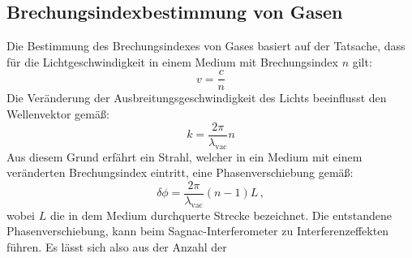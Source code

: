 \subsection{Brechungsindexbestimmung von Gasen}
Die Bestimmung des Brechungsindexes von Gases basiert auf der Tatsache, dass für die Lichtgeschwindigkeit in einem Medium mit Brechungsindex $n$ gilt:
\begin{equation}
  v=\frac{c}{n}
\end{equation}
Die Veränderung der Ausbreitungsgeschwindigkeit des Lichts beeinflusst den Wellenvektor gemäß:
\begin{equation}
  k = \frac{2\pi}{\lambda_{\text{vac}}}n
\end{equation}
Aus diesem Grund erfährt ein Strahl, welcher in ein Medium mit einem veränderten Brechungsindex eintritt, eine Phasenverschiebung gemäß:
\begin{equation}
  \delta \phi= \frac{2\pi}{\lambda_{\text{vac}}}(n-1)L \, ,
\end{equation}
wobei  $L$ die in dem Medium durchquerte Strecke bezeichnet. Die entstandene Phasenverschiebung, kann beim Sagnac-Interferometer zu Interferenzeffekten führen. Es lässt sich also
aus der Anzahl der
